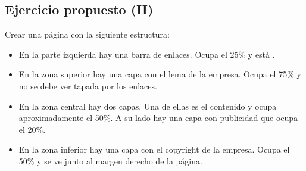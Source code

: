 \documentclass[letterpaper,10pt,spanish]{sphinxmanual}
\begin{document}
\begin{sphinxVerbatim}[commandchars=\\\{\}]
     
   

     
   
   
   
   

     

    
\end{sphinxVerbatim}


\subsection{Ejercicio propuesto (II)}
\label{\detokenize{tema3:ejercicio-propuesto-ii}}
Crear una página con la siguiente estructura:
\begin{itemize}
\item {} 
En la parte izquierda hay una barra de enlaces. Ocupa el 25\% y está .

\item {} 
En la zona superior hay una capa con el lema de la empresa. Ocupa el 75\% y no se debe ver tapada por los enlaces.

\item {} 
En la zona central hay dos capas. Una de ellas es el contenido y ocupa aproximadamente el 50\%. A su lado hay una capa con publicidad que ocupa el 20\%.

\item {} 
En la zona inferior hay una capa con el copyright de la empresa. Ocupa el 50\% y se ve junto al margen derecho de la página.

\end{itemize}
\end{document}
